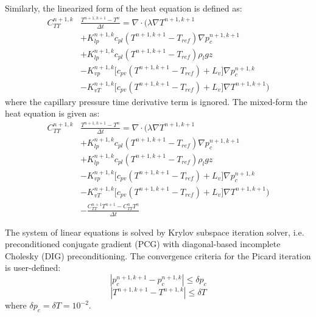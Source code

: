 Similarly, the linearized form of the heat equation is defined as:
\begin{equation}
\begin{split}
	C_{\textit{TT}}^{n+1,k}& \frac{T^{n+1,k+1}-T^{n}}{\Delta t} = \nabla \cdot \bigg(\lambda \nabla T^{n+1,k+1} \\
	&+ K_{\textit{lp}}^{n+1,k} c_{\textit{pl}} \left(T^{n+1,k+1} - T_{\textit{ref}}\right)  \nabla p_c^{n+1,k+1} \\
	&+ K_{\textit{lp}}^{n+1,k} c_{\textit{pl}} \left(T^{n+1,k+1} - T_{\textit{ref}}\right) \rho_l g z\\
	&- K_{\textit{vp}}^{n+1,k} \Big[c_{\textit{pv}} \left(T^{n+1,k+1} - T_{\textit{ref}}\right) + L_v\Big] \nabla p_c^{n+1,k} \\ 
	&- K_{\textit{vT}}^{n+1,k} \Big[c_{\textit{pv}} \left(T^{n+1,k+1} - T_{\textit{ref}}\right) + L_v\Big] \nabla T^{n+1,k+1} \bigg)
\end{split}
\end{equation}
where the capillary pressure time derivative term is ignored. The mixed-form the heat equation is given as:
\begin{equation}
\begin{split}
C_{\textit{TT}}^{n+1,k}&\frac{T^{n+1,k+1}-T^{n}}{\Delta t} = \nabla \cdot \bigg(\lambda \nabla T^{n+1,k+1} \\
&+ K_{\textit{lp}}^{n+1,k} c_{\textit{pl}} \left(T^{n+1,k+1} - T_{\textit{ref}}\right)  \nabla p_c^{n+1,k+1} \\
&+ K_{\textit{lp}}^{n+1,k} c_{\textit{pl}} \left(T^{n+1,k+1} - T_{\textit{ref}}\right) \rho_l g z\\
&- K_{\textit{vp}}^{n+1,k} \Big[c_{\textit{pv}} \left(T^{n+1,k+1} - T_{\textit{ref}}\right) + L_v\Big] \nabla p_c^{n+1,k} \\
&- K_{\textit{vT}}^{n+1,k} \Big[c_{\textit{pv}} \left(T^{n+1,k+1} - T_{\textit{ref}}\right) + L_v\Big] \nabla T^{n+1,k+1} \bigg)\\
&- \frac{C_{TT}^{n+1}T^{n+1} - C_{TT}^{n}T^{n}}{\Delta t}
\end{split}
\end{equation}


The system of linear equations is solved by Krylov subspace iteration solver, i.e. preconditioned conjugate gradient (PCG) with diagonal-based incomplete Cholesky (DIG) preconditioning. The convergence criteria for the Picard iteration is user-defined: 
\begin{equation}
\left| p_c^{n+1,k+1} - p_c^{n+1,k}\right| \le \delta p_c
\end{equation}
\begin{equation}
\left| T^{n+1,k+1} - T^{n+1,k}\right| \le \delta T
\end{equation}
where $\delta p_c = \delta T = 10^{-2}$.

